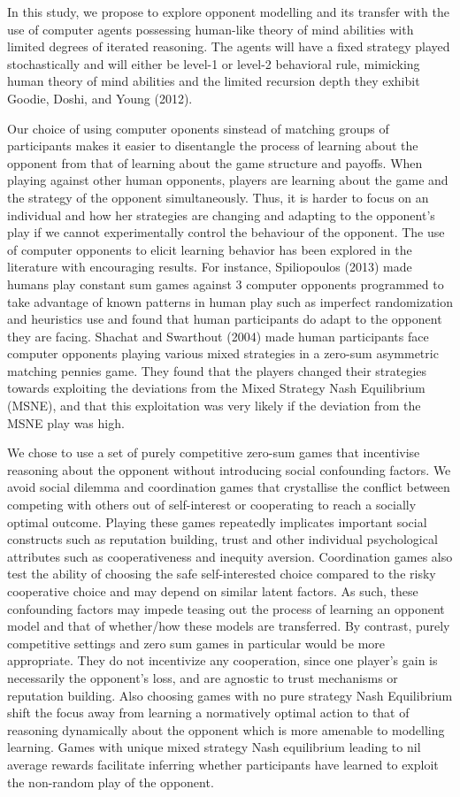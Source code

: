 \documentclass[man,floatsintext]{apa6}
\begin{document}
In this study, we propose to explore opponent modelling and its transfer with the use of computer agents possessing human-like theory of mind abilities with limited degrees of iterated reasoning. The agents will have a fixed strategy played stochastically and will either be level-1 or level-2 behavioral rule, mimicking human theory of mind abilities and the limited recursion depth they exhibit Goodie, Doshi, and Young (2012).

Our choice of using computer oponents sinstead of matching groups of participants makes it easier to disentangle the process of learning about the opponent from that of learning about the game structure and payoffs. When playing against other human opponents, players are learning about the game and the strategy of the opponent simultaneously. Thus, it is harder to focus on an individual and how her strategies are changing and adapting to the opponent's play if we cannot experimentally control the behaviour of the opponent. The use of computer opponents to elicit learning behavior has been explored in the literature with encouraging results. For instance, Spiliopoulos (2013) made humans play constant sum games against 3 computer opponents programmed to take advantage of known patterns in human play such as imperfect randomization and heuristics use and found that human participants do adapt to the opponent they are facing. Shachat and Swarthout (2004) made human participants face computer opponents playing various mixed strategies in a zero-sum asymmetric matching pennies game. They found that the players changed their strategies towards exploiting the deviations from the Mixed Strategy Nash Equilibrium (MSNE), and that this exploitation was very likely if the deviation from the MSNE play was high.

We chose to use a set of purely competitive zero-sum games that incentivise reasoning about the opponent without introducing social confounding factors. We avoid social dilemma and coordination games that crystallise the conflict between competing with others out of self-interest or cooperating to reach a socially optimal outcome. Playing these games repeatedly implicates important social constructs such as reputation building, trust and other individual psychological attributes such as cooperativeness and inequity aversion. Coordination games also test the ability of choosing the safe self-interested choice compared to the risky cooperative choice and may depend on similar latent factors. As such, these confounding factors may impede teasing out the process of learning an opponent model and that of whether/how these models are transferred. By contrast, purely competitive settings and zero sum games in particular would be more appropriate. They do not incentivize any cooperation, since one player's gain is necessarily the opponent's loss, and are agnostic to trust mechanisms or reputation building. Also choosing games with no pure strategy Nash Equilibrium shift the focus away from learning a normatively optimal action to that of reasoning dynamically about the opponent which is more amenable to modelling learning. Games with unique mixed strategy Nash equilibrium leading to nil average rewards facilitate inferring whether participants have learned to exploit the non-random play of the opponent.
\end{document}
